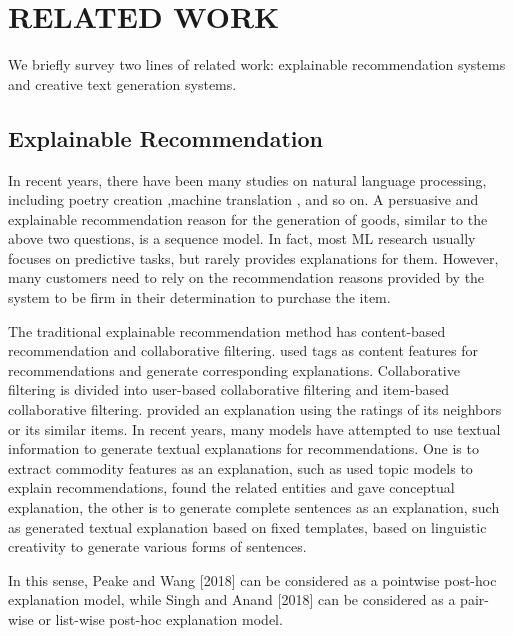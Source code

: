 \documentclass[sigconf]{acmart}
\begin{document}
\section{RELATED WORK}\label{sec:related}
We briefly survey two lines of related work: explainable recommendation systems and creative text generation systems.

\subsection{Explainable Recommendation}

In recent years, there have been many studies on natural language processing, including poetry creation \cite{Colton2012Full,Oliveira2015Tra,Ghazvininejad2016Generating,Yi2017Generating,Zhang2014Chinese,wang2016chinese},machine translation \cite{Kalchbrenner2016Neural,Zhou2016Deep,Wu2016Google}, and so on. A persuasive and explainable recommendation reason for the generation of goods, similar to the above two questions, is a sequence model. In fact, most ML research usually focuses on predictive tasks, but rarely provides explanations for them. However, many customers need to rely on the recommendation reasons provided by the system to be firm in their determination to purchase the item.

The traditional explainable recommendation method has content-based recommendation and collaborative filtering. \cite{vig2009tagsplanations,sigurbjornsson2008flickr} used tags as content features for recommendations and generate corresponding explanations. Collaborative filtering is divided into user-based collaborative filtering and item-based collaborative filtering. \cite{herlocker2000explaining, gedikli2014should,sarwar2001item} provided an explanation using the ratings of its neighbors or its similar items. In recent years, many models have attempted to use textual information to generate textual explanations for recommendations. One is to extract commodity features as an explanation, such as \cite{wu2015flame} used topic models to explain recommendations, \cite{zhang2017entity} found the related entities and gave conceptual explanation, the other is to generate complete sentences as an explanation, such as \cite{ozbal2013brainsup} generated textual explanation based on fixed templates, \cite{munigala2018persuaide} based on linguistic creativity to generate various forms of sentences. 

In this sense, Peake and Wang [2018] can be considered as a pointwise
post-hoc explanation model, while Singh and Anand [2018] can be
considered as a pair-wise or list-wise post-hoc explanation model.
\end{document}
